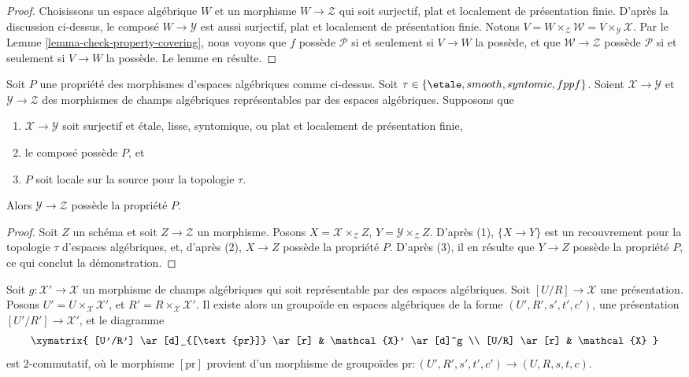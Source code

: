 \begin{proof}
Choisissons un espace algébrique $W$ et un morphisme
$W \to \mathcal{Z}$ qui soit surjectif, plat et localement de présentation
finie. D'après la discussion ci-dessus, le composé
$W \to \mathcal{Y}$ est aussi surjectif, plat et localement de présentation
finie. Notons
$V = W \times_\mathcal{Z} \mathcal{W} = V \times_\mathcal{Y} \mathcal{X}$.
Par le
Lemme \ref{lemma-check-property-covering},
nous voyons que $f$ possède $\mathcal{P}$ si et seulement si $V \to W$ la possède,
et que $\mathcal{W} \to \mathcal{Z}$ possède $\mathcal{P}$ si et seulement
si $V \to W$ la possède. Le lemme en résulte.
\end{proof}

\begin{lemma}
\label{lemma-check-property-after-precomposing}
Soit $P$ une propriété des morphismes d'espaces algébriques comme ci-dessus.
Soit $\tau \in \{\etale, smooth, syntomic, fppf\}$.
Soient $\mathcal{X} \to \mathcal{Y}$ et $\mathcal{Y} \to \mathcal{Z}$
des morphismes de champs algébriques représentables par des espaces algébriques.
Supposons que
\begin{enumerate}
\item $\mathcal{X} \to \mathcal{Y}$ soit surjectif et
\'etale, lisse, syntomique, ou plat et localement de présentation finie,
\item le composé possède $P$, et
\item $P$ soit locale sur la source pour la topologie $\tau$.
\end{enumerate}
Alors $\mathcal{Y} \to \mathcal{Z}$ possède la propriété $P$.
\end{lemma}

\begin{proof}
Soit $Z$ un schéma et soit $Z \to \mathcal{Z}$ un morphisme.
Posons $X = \mathcal{X} \times_\mathcal{Z} Z$,
$Y = \mathcal{Y} \times_\mathcal{Z} Z$. D'après (1), $\{X \to Y\}$
est un recouvrement pour la topologie $\tau$ d'espaces algébriques, et, d'après (2), $X \to Z$ possède la propriété
$P$. D'après (3), il en résulte que $Y \to Z$ possède la propriété $P$,
ce qui conclut la démonstration.
\end{proof}

\begin{lemma}
\label{lemma-representable-in-terms-presentations}
Soit $g : \mathcal{X}' \to \mathcal{X}$ un morphisme de champs algébriques
qui soit représentable par des espaces algébriques. Soit $[U/R] \to \mathcal{X}$
une présentation. Posons $U' = U \times_\mathcal{X} \mathcal{X}'$,
et $R' = R \times_\mathcal{X} \mathcal{X}'$.
Il existe alors un groupoïde en espaces algébriques de la forme
$(U', R', s', t', c')$, une présentation $[U'/R'] \to \mathcal{X}'$,
et le diagramme
$$
\xymatrix{
[U'/R'] \ar[d]_{[\text{pr}]} \ar[r] & \mathcal{X}' \ar[d]^g \\
[U/R] \ar[r] & \mathcal{X}
}
$$
est $2$-commutatif, où le morphisme $[\text{pr}]$ provient d'un
morphisme de groupoïdes
$\text{pr} : (U', R', s', t', c') \to (U, R, s, t, c)$.
\end{lemma}

